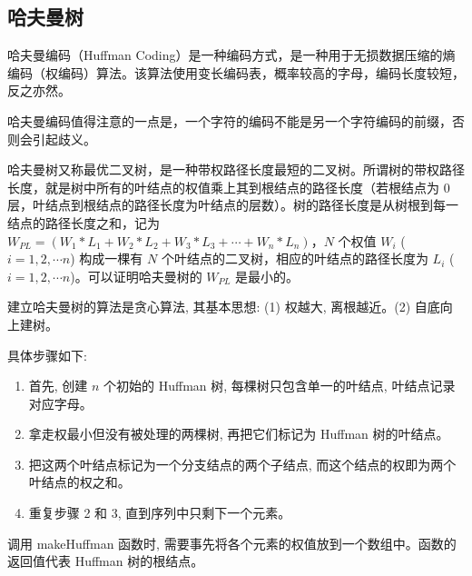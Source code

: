 \subsection{哈夫曼树}
	哈夫曼编码（Huffman Coding）是一种编码方式，是一种用于无损数据压缩的熵编码（权编码）算法。该算法使用变长编码表，概率较高的字母，编码长度较短，反之亦然。
	
	哈夫曼编码值得注意的一点是，一个字符的编码不能是另一个字符编码的前缀，否则会引起歧义。

	哈夫曼树又称最优二叉树，是一种带权路径长度最短的二叉树。所谓树的带权路径长度，就是树中所有的叶结点的权值乘上其到根结点的路径长度（若根结点为 0 层，叶结点到根结点的路径长度为叶结点的层数）。树的路径长度是从树根到每一结点的路径长度之和，记为 $W_{PL}=(W_1*L_1+W_2*L_2+W_3*L_3+\cdots+W_n*L_n)$，$N$ 个权值 $W_i$ ($i=1,2,\cdots n$) 构成一棵有 $N$ 个叶结点的二叉树，相应的叶结点的路径长度为 $L_i$ ($i=1,2,\cdots n$)。可以证明哈夫曼树的 $W_{PL}$ 是最小的。

	建立哈夫曼树的算法是贪心算法, 其基本思想: (1) 权越大, 离根越近。(2) 自底向上建树。
	
	具体步骤如下:

	\begin{enumerate}
		\item 首先, 创建 $n$ 个初始的 Huffman 树, 每棵树只包含单一的叶结点, 叶结点记录对应字母。
		\item 拿走权最小但没有被处理的两棵树, 再把它们标记为 Huffman 树的叶结点。
		\item 把这两个叶结点标记为一个分支结点的两个子结点, 而这个结点的权即为两个叶结点的权之和。
		\item 重复步骤 2 和 3, 直到序列中只剩下一个元素。
	\end{enumerate}

	调用 makeHuffman 函数时, 需要事先将各个元素的权值放到一个数组中。函数的返回值代表 Huffman 树的根结点。
	
	